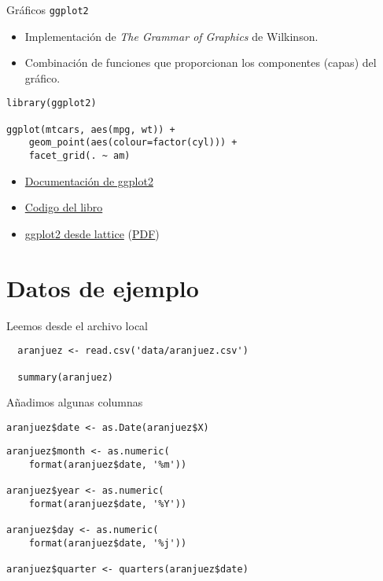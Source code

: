 \documentclass[aspectratio=169, usenames,svgnames,dvipsnames]{beamer}
\begin{document}
\begin{frame}[label={sec:org7712b92},fragile]{Gráficos \texttt{ggplot2}}
 \begin{itemize}
\item Implementación de \emph{The Grammar of Graphics} de Wilkinson.

\item Combinación de funciones que proporcionan los componentes (capas) del gráfico.
\end{itemize}

\lstset{language=r,label= ,caption= ,captionpos=b,numbers=none}
\begin{lstlisting}
library(ggplot2)

ggplot(mtcars, aes(mpg, wt)) +
    geom_point(aes(colour=factor(cyl))) +
    facet_grid(. ~ am)
\end{lstlisting}

\begin{itemize}
\item \href{http://docs.ggplot2.org/current/}{Documentación de ggplot2}
\item \href{http://ggplot2.org/book/}{Codigo del libro}
\item \href{http://learnr.wordpress.com/2009/06/28/ggplot2-version-of-figures-in-lattice-multivariate-data-visualization-with-r-part-1/}{ggplot2 desde lattice} (\href{http://learnr.files.wordpress.com/2009/08/latbook.pdf}{PDF})
\end{itemize}
\end{frame}

\section{Datos de ejemplo}
\label{sec:org2baa8f6}
\begin{frame}[label={sec:org9883a3a},fragile]{Leemos desde el archivo local}
 \lstset{language=r,label= ,caption= ,captionpos=b,numbers=none}
\begin{lstlisting}
  aranjuez <- read.csv('data/aranjuez.csv')

  summary(aranjuez)
\end{lstlisting}
\end{frame}

\begin{frame}[label={sec:org154cde7},fragile]{Añadimos algunas columnas}
 \lstset{language=r,label= ,caption= ,captionpos=b,numbers=none}
\begin{lstlisting}
aranjuez$date <- as.Date(aranjuez$X)
\end{lstlisting}
\lstset{language=r,label= ,caption= ,captionpos=b,numbers=none}
\begin{lstlisting}
aranjuez$month <- as.numeric(
    format(aranjuez$date, '%m'))

aranjuez$year <- as.numeric(
    format(aranjuez$date, '%Y'))

aranjuez$day <- as.numeric(
    format(aranjuez$date, '%j'))

aranjuez$quarter <- quarters(aranjuez$date)
      
\end{lstlisting}
\end{frame}
\end{document}
